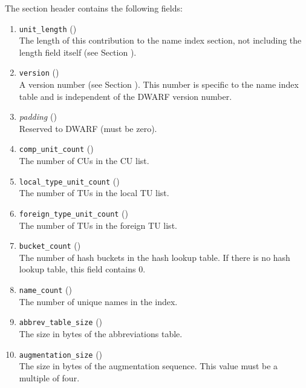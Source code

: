 \label{chap:sectionheader}
The section header contains the following fields:
\begin{enumerate}[1. ]
\item \texttt{unit\_length} () \\
The length of this contribution to the name index section,
not including the length field itself
\bb
(see Section ).
\eb


\item \texttt{version} (\HFTuhalf) \\
A version number 
(see Section ). 
This number is specific to the name index table and is
independent of the DWARF version number.

\item \textit{padding} (\HFTuhalf) \\
Reserved to DWARF (must be zero). 

\item \texttt{comp\_unit\_count} (\HFTuword) \\
The number of CUs in the CU list.

\item \texttt{local\_type\_unit\_count} (\HFTuword) \\
The number of TUs in the local TU list.

\item \texttt{foreign\_type\_unit\_count} (\HFTuword) \\
The number of TUs in the foreign TU list.

\item \texttt{bucket\_count} (\HFTuword) \\
The number of hash buckets in the hash lookup table. 
If there is no hash lookup table, this field contains 0.

\item \texttt{name\_count} (\HFTuword) \\
The number of unique names in the index.

\item \texttt{abbrev\_table\_size} (\HFTuword) \\
The size in bytes of the abbreviations table.

\item 
\bb
\texttt{augmentation\_size} (\HFTuword) \\
The size in bytes of the augmentation sequence. 
This value must be a multiple of four.
\eb


\end{enumerate}
